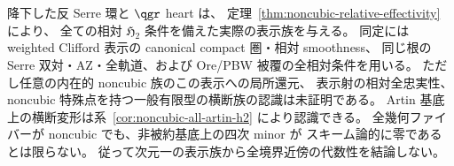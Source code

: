 \begin{remark}[明示表示族と横断認識の区別]
降下した反 Serre 環と $\qgr$ heart は、
定理~\ref{thm:noncubic-relative-effectivity} により、
全ての相対 $\mathfrak H_2$ 条件を備えた実際の表示族を与える。
同定には weighted Clifford 表示の canonical compact 圏・相対 smoothness、
同じ根の Serre 双対・AZ・全軌道、および Ore/PBW 被覆の全相対条件を用いる。
ただし任意の内在的 noncubic 族のこの表示への局所還元、
表示射の相対全忠実性、noncubic 特殊点を持つ一般有限型の横断族の認識は未証明である。
Artin 基底上の横断変形は系~\ref{cor:noncubic-all-artin-h2} により認識できる。
全幾何ファイバーが noncubic でも、非被約基底上の四次 minor が
スキーム論的に零であるとは限らない。
従って次元一の表示族から全境界近傍の代数性を結論しない。
\end{remark}
